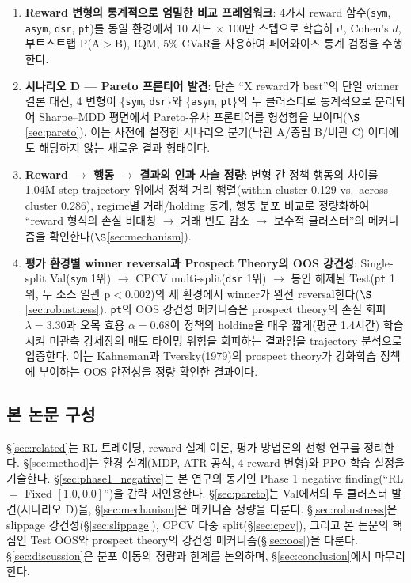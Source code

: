 \documentclass[11pt, a4paper]{article}
\begin{document}
\begin{enumerate}[leftmargin=*]
\item \textbf{Reward 변형의 통계적으로 엄밀한 비교 프레임워크}: 4가지 reward
함수(\texttt{sym}, \texttt{asym}, \texttt{dsr}, \texttt{pt})를 동일 환경에서
10 시드 $\times$ 100만 스텝으로 학습하고, Cohen's $d$, 부트스트랩 P(A$>$B), IQM,
5\% CVaR을 사용하여 페어와이즈 통계 검정을 수행한다.
\item \textbf{시나리오 D --- Pareto 프론티어 발견}: 단순 ``X reward가 best''의
단일 winner 결론 대신, 4 변형이 \{\texttt{sym}, \texttt{dsr}\}와
\{\texttt{asym}, \texttt{pt}\}의 두 클러스터로 통계적으로 분리되어 Sharpe--MDD
평면에서 Pareto-유사 프론티어를 형성함을 보이며($\S$\ref{sec:pareto}), 이는 사전에
설정한 시나리오 분기(낙관 A/중립 B/비관 C) 어디에도 해당하지 않는 새로운 결과 형태이다.
\item \textbf{Reward $\to$ 행동 $\to$ 결과의 인과 사슬 정량}: 변형 간 정책 행동의
차이를 1.04M step trajectory 위에서 정책 거리 행렬(within-cluster 0.129 vs.\
across-cluster 0.286), regime별 거래/holding 통계, 행동 분포 비교로 정량화하여
``reward 형식의 손실 비대칭 $\to$ 거래 빈도 감소 $\to$ 보수적 클러스터''의 메커니즘을
확인한다($\S$\ref{sec:mechanism}).
\item \textbf{평가 환경별 winner reversal과 Prospect Theory의 OOS 강건성}:
Single-split Val(\texttt{sym} 1위) $\to$ CPCV multi-split(\texttt{dsr} 1위) $\to$
봉인 해제된 Test(\texttt{pt} 1위, 두 소스 일관 p$<$0.002)의 세 환경에서 winner가
완전 reversal한다($\S$\ref{sec:robustness}). \texttt{pt}의 OOS 강건성 메커니즘은
prospect theory의 손실 회피 $\lambda=3.30$과 오목 효용 $\alpha=0.68$이 정책의
holding을 매우 짧게(평균 1.4시간) 학습시켜 미관측 강세장의 매도 타이밍 위험을
회피하는 결과임을 trajectory 분석으로 입증한다. 이는 Kahneman과 Tversky(1979)의
prospect theory가 강화학습 정책에 부여하는 OOS 안전성을 정량 확인한 결과이다.
\end{enumerate}

\subsection{본 논문 구성}
\label{sec:intro_structure}

\S\ref{sec:related}는 RL 트레이딩, reward 설계 이론, 평가 방법론의 선행 연구를
정리한다. \S\ref{sec:method}는 환경 설계(MDP, ATR 공식, 4 reward 변형)와 PPO 학습
설정을 기술한다. \S\ref{sec:phase1_negative}는 본 연구의 동기인 Phase 1 negative
finding(``RL $=$ Fixed $[1.0, 0.0]$'')을 간략 재인용한다. \S\ref{sec:pareto}는
Val에서의 두 클러스터 발견(시나리오 D)을, \S\ref{sec:mechanism}은 메커니즘 정량을
다룬다. \S\ref{sec:robustness}은 slippage 강건성(\S\ref{sec:slippage}), CPCV
다중 split(\S\ref{sec:cpcv}), 그리고 본 논문의 핵심인 Test OOS와
prospect theory의 강건성 메커니즘(\S\ref{sec:oos})을 다룬다. \S\ref{sec:discussion}은
분포 이동의 정량과 한계를 논의하며, \S\ref{sec:conclusion}에서 마무리한다.
\end{document}
